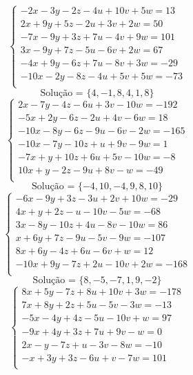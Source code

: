 \documentclass[12pt,oneside,a4paper]{article}
\begin{document}
\vspace{\baselineskip}
\begin{equation*}
\begin{cases}
-2x-3y-2z-4u+10v+5w=13 \\
2x+9y+5z-2u+3v+2w=50 \\
-7x-9y+3z+7u-4v+9w=101 \\
3x-9y+7z-5u-6v+2w=67 \\
-4x+9y-6z+7u-8v+3w=-29 \\
-10x-2y-8z-4u+5v+5w=-73 \\
\end{cases}
\end{equation*}
\begin{equation*}
\text{Solução = }\{4,-1,8,4,1,8\}
\end{equation*}
\vspace{\baselineskip}
\begin{equation*}
\begin{cases}
2x-7y-4z-6u+3v-10w=-192 \\
-5x+2y-6z-2u+4v-6w=18 \\
-10x-8y-6z-9u-6v-2w=-165 \\
-10x-7y-10z+u+9v-9w=1 \\
-7x+y+10z+6u+5v-10w=-8 \\
10x+y-2z-9u+8v-w=-49 \\
\end{cases}
\end{equation*}
\begin{equation*}
\text{Solução = }\{-4,10,-4,9,8,10\}
\end{equation*}
\vspace{\baselineskip}
\begin{equation*}
\begin{cases}
-6x-9y+3z-3u+2v+10w=-29 \\
4x+y+2z-u-10v-5w=-68 \\
3x-8y-10z+4u-8v-10w=86 \\
x+6y+7z-9u-5v-9w=-107 \\
8x+6y-4z+6u-6v+w=12 \\
-10x+9y-7z+2u-10v+2w=-168 \\
\end{cases}
\end{equation*}
\begin{equation*}
\text{Solução = }\{8,-5,-7,1,9,-2\}
\end{equation*}
\vspace{\baselineskip}
\begin{equation*}
\begin{cases}
8x+5y-7z+8u+10v+3w=-178 \\
7x+8y+2z+5u-5v-3w=-13 \\
-5x-4y+4z-5u-10v+w=97 \\
-9x+4y+3z+7u+9v-w=0 \\
2x-y-7z+u-3v-8w=-10 \\
-x+3y+3z-6u+v-7w=101 \\
\end{cases}
\end{equation*}
\end{document}
